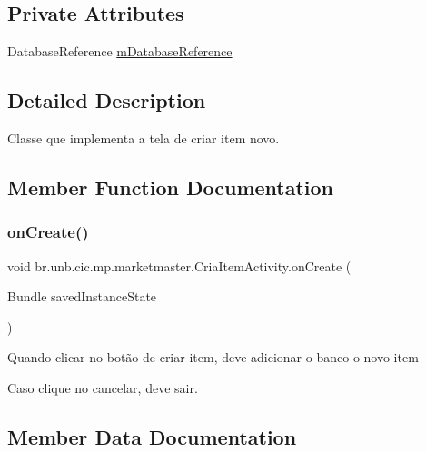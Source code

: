 \subsection*{Private Attributes}
\begin{DoxyCompactItemize}
\item 
Database\+Reference \mbox{\hyperlink{classbr_1_1unb_1_1cic_1_1mp_1_1marketmaster_1_1CriaItemActivity_a8cfd47c3e8edd653139be67ca31f8d31}{m\+Database\+Reference}}
\end{DoxyCompactItemize}


\subsection{Detailed Description}
Classe que implementa a tela de criar item novo. 

\subsection{Member Function Documentation}
\mbox{\label{classbr_1_1unb_1_1cic_1_1mp_1_1marketmaster_1_1CriaItemActivity_aa64ce86007e53df5dfa6995caa852d07}} 
\subsubsection{\texorpdfstring{on\+Create()}{onCreate()}}
{\footnotesize\ttfamily void br.\+unb.\+cic.\+mp.\+marketmaster.\+Cria\+Item\+Activity.\+on\+Create (\begin{DoxyParamCaption}\item[{Bundle}]{saved\+Instance\+State }\end{DoxyParamCaption})\hspace{0.3cm}{\ttfamily [protected]}}

Quando clicar no botão de criar item, deve adicionar o banco o novo item

Caso clique no cancelar, deve sair.

\subsection{Member Data Documentation}
\mbox{\label{classbr_1_1unb_1_1cic_1_1mp_1_1marketmaster_1_1CriaItemActivity_a1592397486488e3cf1c6308292625e6c}} 
